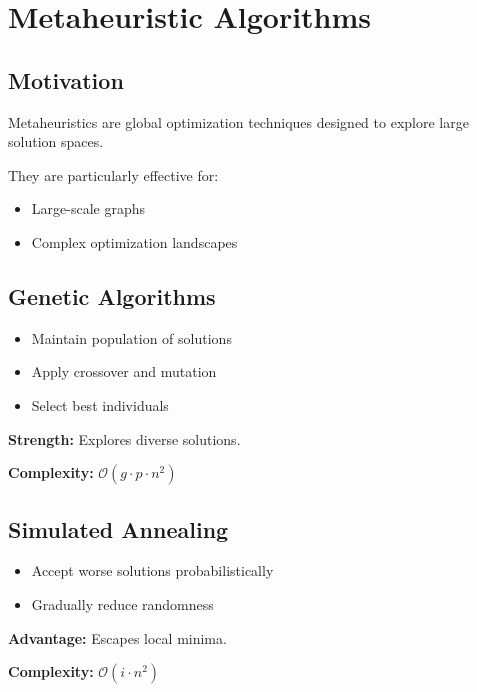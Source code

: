 \documentclass[10pt,a4paper]{report}
\theoremstyle{definition}
\newcommand{\bigO}[1]{\mathcal{O}\!\left(#1\right)}
\begin{document}
\section{Metaheuristic Algorithms}

\subsection{Motivation}

Metaheuristics are global optimization techniques designed to explore large solution spaces.

They are particularly effective for:
\begin{itemize}
  \item Large-scale graphs
  \item Complex optimization landscapes
\end{itemize}

\subsection{Genetic Algorithms}

\begin{itemize}
  \item Maintain population of solutions
  \item Apply crossover and mutation
  \item Select best individuals
\end{itemize}

\textbf{Strength:} Explores diverse solutions.

\textbf{Complexity:} $\bigO{g \cdot p \cdot n^2}$

\subsection{Simulated Annealing}

\begin{itemize}
  \item Accept worse solutions probabilistically
  \item Gradually reduce randomness
\end{itemize}

\textbf{Advantage:} Escapes local minima.

\textbf{Complexity:} $\bigO{i \cdot n^2}$
\end{document}
